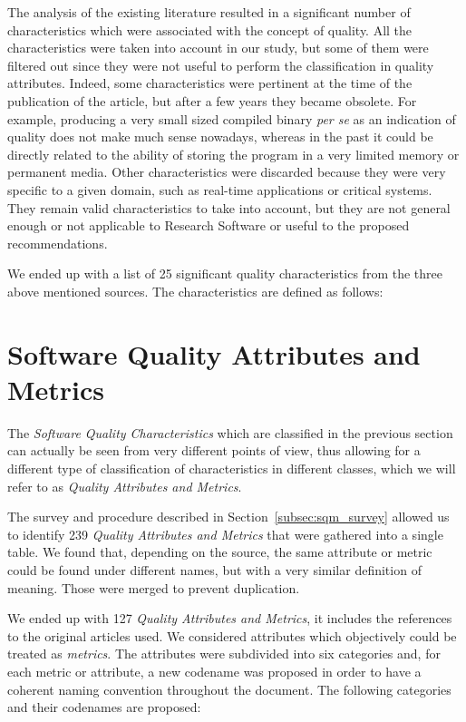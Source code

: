 \documentclass[a4paper]{article}
\begin{document}
The analysis of the existing literature resulted in a significant number of characteristics which were associated with the concept of quality. All the characteristics were taken into account in our study, but some of them were filtered out since they were not useful to perform the classification in quality attributes. Indeed, some characteristics were pertinent at the time of the publication of the article, but after a few years they became obsolete. For example, producing a very small sized compiled binary \textit{per se} as an indication of quality does not make much sense nowadays, whereas in the past it could be directly related to the ability of storing the program in a very limited memory or permanent media. Other characteristics were discarded because they were very specific to a given domain, such as real-time applications or critical systems. They remain valid characteristics to take into account, but they are not general enough or not applicable to Research Software or useful to the proposed recommendations.

We ended up with a list of 25 significant quality characteristics from the three above mentioned sources. The characteristics are defined as follows:



\newpage
\section{Software Quality Attributes and Metrics}
\label{subsec:SW_quality_attributes}

The \textit{Software Quality Characteristics} which are classified in the previous section can actually be seen from very different points of view, thus allowing for a different type of classification of characteristics in different classes, which we will refer to as \textit{Quality Attributes and Metrics}.

The survey and procedure described in Section~\ref{subsec:sqm_survey} allowed us to identify 239 \textit{Quality Attributes and Metrics} that were gathered into a single table. We found that, depending on the source, the same attribute or metric could be found under different names, but with a very similar definition of meaning. Those were merged to prevent duplication.

We ended up with 127 \textit{Quality Attributes and Metrics}, it includes the references to the original articles used. We considered attributes which objectively could be treated as \textit{metrics}. The attributes were subdivided into six categories and, for each metric or attribute, a new codename was proposed in order to have a coherent naming convention throughout the document. The following categories and their codenames are proposed:
\end{document}
